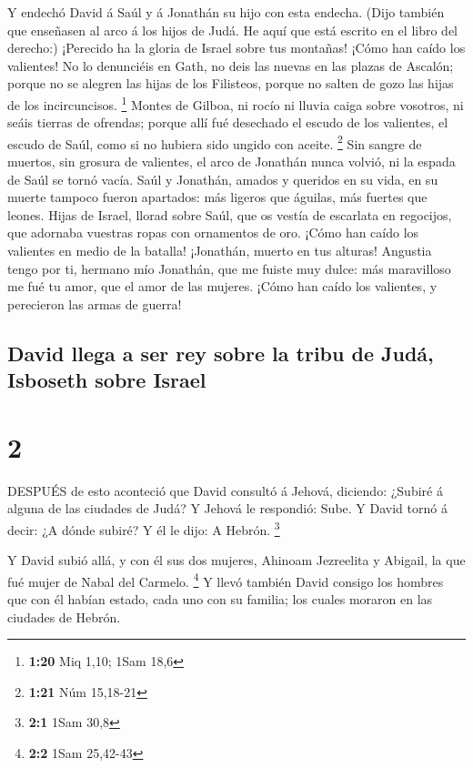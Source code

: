  Y endechó David á Saúl y á Jonathán su hijo con esta
endecha.  (Dijo también que enseñasen al arco á los hijos
de Judá. He aquí que está escrito en el libro del derecho:)
 ¡Perecido ha la gloria de Israel sobre tus montañas! ¡Cómo
han caído los valientes!  No lo denunciéis en Gath, no deis
las nuevas en las plazas de Ascalón; porque no se alegren las hijas de
los Filisteos, porque no salten de gozo las hijas de los incircuncisos.
\footnote{\textbf{1:20} Miq 1,10; 1Sam 18,6}  Montes de
Gilboa, ni rocío ni lluvia caiga sobre vosotros, ni seáis tierras de
ofrendas; porque allí fué desechado el escudo de los valientes, el
escudo de Saúl, como si no hubiera sido ungido con aceite. \footnote{\textbf{1:21}
  Núm 15,18-21}  Sin sangre de muertos, sin grosura de
valientes, el arco de Jonathán nunca volvió, ni la espada de Saúl se
tornó vacía.  Saúl y Jonathán, amados y queridos en su
vida, en su muerte tampoco fueron apartados: más ligeros que águilas,
más fuertes que leones.  Hijas de Israel, llorad sobre
Saúl, que os vestía de escarlata en regocijos, que adornaba vuestras
ropas con ornamentos de oro.  ¡Cómo han caído los valientes
en medio de la batalla! ¡Jonathán, muerto en tus alturas! 
Angustia tengo por ti, hermano mío Jonathán, que me fuiste muy dulce:
más maravilloso me fué tu amor, que el amor de las mujeres.
 ¡Cómo han caído los valientes, y perecieron las armas de
guerra!

\hypertarget{david-llega-a-ser-rey-sobre-la-tribu-de-juduxe1-isboseth-sobre-israel}{%
\subsection{David llega a ser rey sobre la tribu de Judá, Isboseth sobre
Israel}\label{david-llega-a-ser-rey-sobre-la-tribu-de-juduxe1-isboseth-sobre-israel}}

\hypertarget{section-1}{%
\section{2}\label{section-1}}

 DESPUÉS de esto aconteció que David consultó á Jehová,
diciendo: ¿Subiré á alguna de las ciudades de Judá? Y Jehová le
respondió: Sube. Y David tornó á decir: ¿A dónde subiré? Y él le dijo: A
Hebrón. \footnote{\textbf{2:1} 1Sam 30,8}

 Y David subió allá, y con él sus dos mujeres, Ahinoam
Jezreelita y Abigail, la que fué mujer de Nabal del Carmelo. \footnote{\textbf{2:2}
  1Sam 25,42-43}  Y llevó también David consigo los hombres
que con él habían estado, cada uno con su familia; los cuales moraron en
las ciudades de Hebrón.

